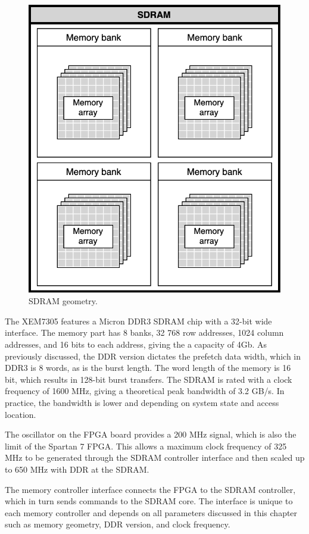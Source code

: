 \documentclass[12pt]{report}
\begin{document}
\begin{figure}[h]
    \centering
    \includegraphics[scale=0.3]{figures/sdram_bank_array.png}
    \caption{SDRAM geometry.}
    \label{fig:8}
\end{figure}

The XEM7305 features a Micron DDR3 SDRAM chip with a 32-bit wide interface. The memory part has 8 banks, 32 768 row addresses, 1024 column addresses, and 16 bits to each address, giving the a capacity of 4Gb. As previously discussed, the DDR version dictates the prefetch data width, which in DDR3 is 8 words, as is the burst length. The word length of the memory is 16 bit, which results in 128-bit burst transfers. The SDRAM is rated with a clock frequency of 1600 MHz, giving a theoretical peak bandwidth of 3.2 GB/s. In practice, the bandwidth is lower and depending on system state and access location. \citep{XEM7305Man}
\par
The oscillator on the FPGA board provides a 200 MHz signal, which is also the limit of the Spartan 7 FPGA. This allows a maximum clock frequency of 325 MHz to be generated through the SDRAM controller interface and then scaled up to 650 MHz with DDR at the SDRAM.
\citep{XEM7305Man} \citep{MicronSDRAM}
\par
The memory controller interface connects the FPGA to the SDRAM controller, which in turn sends commands to the SDRAM core. The interface is unique to each memory controller and depends on all parameters discussed in this chapter such as memory geometry, DDR version, and clock frequency. \citep{XEM7305Man}
\end{document}
